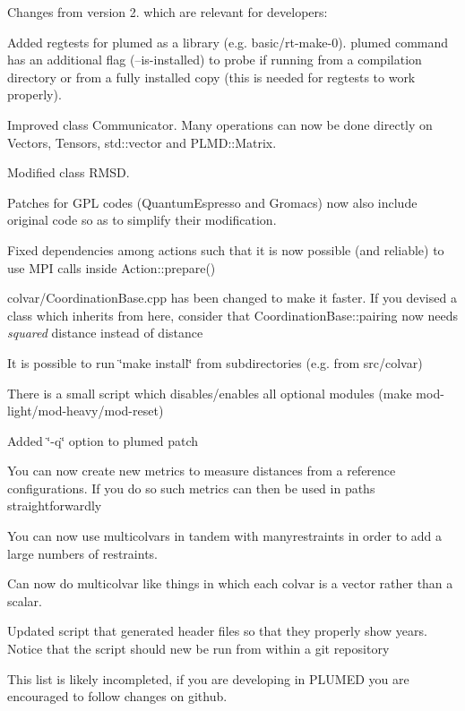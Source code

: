 Changes from version 2. which are relevant for developers\+:
\begin{DoxyItemize}
\item Added regtests for plumed as a library (e.\+g. basic/rt-\/make-\/0). plumed command has an additional flag (--is-\/installed) to probe if running from a compilation directory or from a fully installed copy (this is needed for regtests to work properly).
\item Improved class Communicator. Many operations can now be done directly on Vectors, Tensors, std\+::vector and P\+L\+M\+D\+::\+Matrix.
\item Modified class R\+M\+S\+D.
\item Patches for G\+P\+L codes (Quantum\+Espresso and Gromacs) now also include original code so as to simplify their modification.
\item Fixed dependencies among actions such that it is now possible (and reliable) to use M\+P\+I calls inside Action\+::prepare()
\item colvar/\+Coordination\+Base.\+cpp has been changed to make it faster. If you devised a class which inherits from here, consider that Coordination\+Base\+::pairing now needs {\itshape squared} distance instead of distance
\item It is possible to run \char`\"{}make install\char`\"{} from subdirectories (e.\+g. from src/colvar)
\item There is a small script which disables/enables all optional modules (make mod-\/light/mod-\/heavy/mod-\/reset)
\item Added \char`\"{}-\/q\char`\"{} option to plumed patch
\item You can now create new metrics to measure distances from a reference configurations. If you do so such metrics can then be used in paths straightforwardly
\item You can now use multicolvars in tandem with manyrestraints in order to add a large numbers of restraints.
\item Can now do multicolvar like things in which each colvar is a vector rather than a scalar.
\item Updated script that generated header files so that they properly show years. Notice that the script should new be run from within a git repository
\end{DoxyItemize}

This list is likely incompleted, if you are developing in P\+L\+U\+M\+E\+D you are encouraged to follow changes on github.

